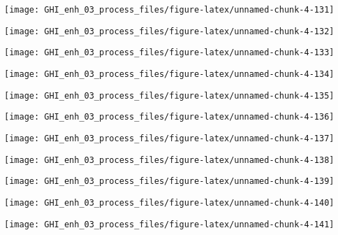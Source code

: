 \documentclass[
  10pt,
  a4paper,oneside]{article}
\begin{document}
\begin{center}\texttt{[image: GHI\_enh\_03\_process\_files/figure-latex/unnamed-chunk-4-131]} \end{center}

\begin{center}\texttt{[image: GHI\_enh\_03\_process\_files/figure-latex/unnamed-chunk-4-132]} \end{center}

\begin{center}\texttt{[image: GHI\_enh\_03\_process\_files/figure-latex/unnamed-chunk-4-133]} \end{center}

\begin{center}\texttt{[image: GHI\_enh\_03\_process\_files/figure-latex/unnamed-chunk-4-134]} \end{center}

\begin{center}\texttt{[image: GHI\_enh\_03\_process\_files/figure-latex/unnamed-chunk-4-135]} \end{center}

\begin{center}\texttt{[image: GHI\_enh\_03\_process\_files/figure-latex/unnamed-chunk-4-136]} \end{center}

\begin{center}\texttt{[image: GHI\_enh\_03\_process\_files/figure-latex/unnamed-chunk-4-137]} \end{center}

\begin{center}\texttt{[image: GHI\_enh\_03\_process\_files/figure-latex/unnamed-chunk-4-138]} \end{center}

\begin{center}\texttt{[image: GHI\_enh\_03\_process\_files/figure-latex/unnamed-chunk-4-139]} \end{center}

\begin{center}\texttt{[image: GHI\_enh\_03\_process\_files/figure-latex/unnamed-chunk-4-140]} \end{center}

\begin{center}\texttt{[image: GHI\_enh\_03\_process\_files/figure-latex/unnamed-chunk-4-141]} \end{center}
\end{document}
